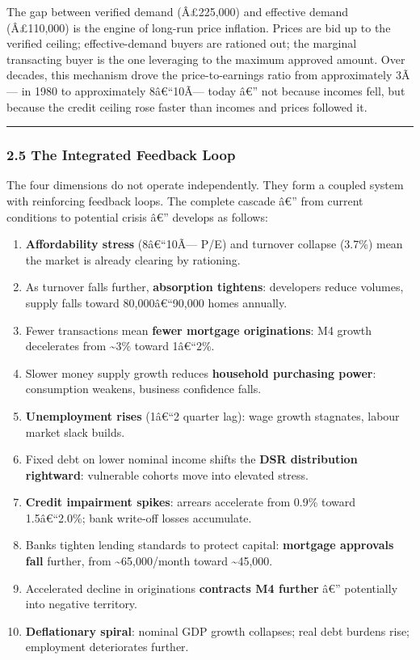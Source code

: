 The gap between verified demand (Â£225,000) and effective demand
(Â£110,000) is the engine of long-run price inflation. Prices are bid up
to the verified ceiling; effective-demand buyers are rationed out; the
marginal transacting buyer is the one leveraging to the maximum approved
amount. Over decades, this mechanism drove the price-to-earnings ratio
from approximately 3Ã--- in 1980 to approximately 8â€``10Ã--- today â€''
not because incomes fell, but because the credit ceiling rose faster
than incomes and prices followed it.

\begin{center}\rule{0.5\linewidth}{0.5pt}\end{center}

\subsubsection{2.5 The Integrated Feedback
Loop}\label{the-integrated-feedback-loop}

The four dimensions do not operate independently. They form a coupled
system with reinforcing feedback loops. The complete cascade â€'' from
current conditions to potential crisis â€'' develops as follows:

\begin{enumerate}
\def\labelenumi{\arabic{enumi}.}
\tightlist
\item
  \textbf{Affordability stress} (8â€``10Ã--- P/E) and turnover collapse
  (3.7\%) mean the market is already clearing by rationing.
\item
  As turnover falls further, \textbf{absorption tightens}: developers
  reduce volumes, supply falls toward 80,000â€``90,000 homes annually.
\item
  Fewer transactions mean \textbf{fewer mortgage originations}: M4
  growth decelerates from \textasciitilde3\% toward 1â€``2\%.
\item
  Slower money supply growth reduces \textbf{household purchasing
  power}: consumption weakens, business confidence falls.
\item
  \textbf{Unemployment rises} (1â€``2 quarter lag): wage growth
  stagnates, labour market slack builds.
\item
  Fixed debt on lower nominal income shifts the \textbf{DSR distribution
  rightward}: vulnerable cohorts move into elevated stress.
\item
  \textbf{Credit impairment spikes}: arrears accelerate from 0.9\%
  toward 1.5â€``2.0\%; bank write-off losses accumulate.
\item
  Banks tighten lending standards to protect capital: \textbf{mortgage
  approvals fall} further, from \textasciitilde65,000/month toward
  \textasciitilde45,000.
\item
  Accelerated decline in originations \textbf{contracts M4 further} â€''
  potentially into negative territory.
\item
  \textbf{Deflationary spiral}: nominal GDP growth collapses; real debt
  burdens rise; employment deteriorates further.
\end{enumerate}

